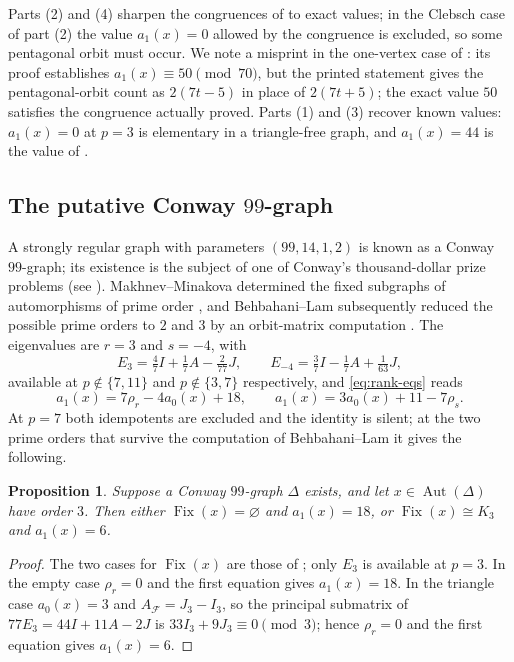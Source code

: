 \documentclass[11pt]{article}
\theoremstyle{plain}
\newtheorem{proposition}[theorem]{Proposition}
\theoremstyle{remark}
\newcommand{\Aut}{\operatorname{Aut}}
\newcommand{\Fix}{\operatorname{Fix}}
\begin{document}
Parts (2) and (4) sharpen the congruences of \cite{Nosov2016} to exact values;
in the Clebsch case of part (2) the value $a_1(x)=0$ allowed by the congruence is excluded,
so some pentagonal orbit must occur.
We note a misprint in the one-vertex case of \cite[Lemma 2.2]{Nosov2016}:
its proof establishes $a_1(x)\equiv 50\pmod{70}$,
but the printed statement gives the pentagonal-orbit count as $2(7t-5)$ in place of $2(7t+5)$;
the exact value $50$ satisfies the congruence actually proved.
Parts (1) and (3) recover known values:
$a_1(x)=0$ at $p=3$ is elementary in a triangle-free graph, and $a_1(x)=44$ is the value of \cite[Lemma 2.4]{Nosov2016}.

\subsection{\texorpdfstring{The putative Conway $99$-graph}{The putative Conway 99-graph}}\label{subsec:conway}

A strongly regular graph with parameters $(99,14,1,2)$ is known as a Conway $99$-graph;
its existence is the subject of one of Conway's thousand-dollar prize problems (see \cite{CesarzWoldar}).
Makhnev--Minakova determined the fixed subgraphs of automorphisms of prime order \cite{MakhnevMinakova},
and Behbahani--Lam subsequently reduced the possible prime orders to $2$ and $3$ by an orbit-matrix computation \cite{BehbahaniLam}.
The eigenvalues are $r=3$ and $s=-4$, with
\[
 E_{3}=\tfrac47I+\tfrac17A-\tfrac2{77}J,
 \qquad
 E_{-4}=\tfrac37I-\tfrac17A+\tfrac1{63}J,
\]
available at $p\notin\{7,11\}$ and $p\notin\{3,7\}$ respectively, and \eqref{eq:rank-eqs} reads
\[
 a_1(x)=7\rho_r-4a_0(x)+18,
 \qquad
 a_1(x)=3a_0(x)+11-7\rho_s.
\]
At $p=7$ both idempotents are excluded and the identity is silent;
at the two prime orders that survive the computation of Behbahani--Lam it gives the following.

\begin{proposition}\label{prop:conway}
Suppose a Conway $99$-graph $\Delta$ exists, and let $x\in\Aut(\Delta)$ have order $3$.
Then either $\Fix(x)=\varnothing$ and $a_1(x)=18$, or $\Fix(x)\cong K_3$ and $a_1(x)=6$.
\end{proposition}

\begin{proof}
The two cases for $\Fix(x)$ are those of \cite{MakhnevMinakova}; only $E_3$ is available at $p=3$.
In the empty case $\rho_r=0$ and the first equation gives $a_1(x)=18$.
In the triangle case $a_0(x)=3$ and $A_{\mathcal F}=J_3-I_3$,
so the principal submatrix of $77E_3=44I+11A-2J$ is $33I_3+9J_3\equiv 0\pmod 3$;
hence $\rho_r=0$ and the first equation gives $a_1(x)=6$.
\end{proof}
\end{document}
